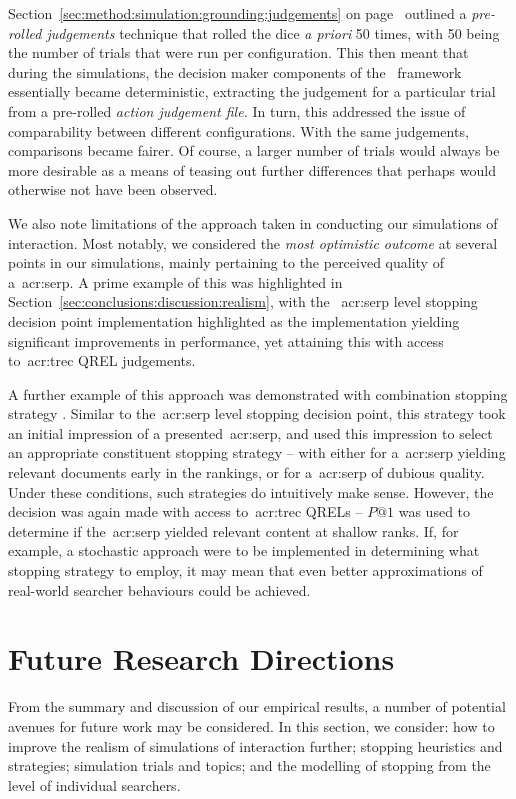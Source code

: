 Section~\ref{sec:method:simulation:grounding:judgements} on page~\pageref{sec:method:simulation:grounding:judgements} outlined a \emph{pre-rolled judgements} technique that rolled the dice \emph{a priori} 50 times, with 50 being the number of trials that were run per configuration. This then meant that during the simulations, the decision maker components of the \simiir~framework essentially became deterministic, extracting the judgement for a particular trial from a pre-rolled \emph{action judgement file.} In turn, this addressed the issue of comparability between different configurations. With the same judgements, comparisons became fairer. Of course, a larger number of trials would always be more desirable as a means of teasing out further differences that perhaps would otherwise not have been observed.

We also note limitations of the approach taken in conducting our simulations of interaction. Most notably, we considered the \emph{most optimistic outcome} at several points in our simulations, mainly pertaining to the perceived quality of a~\gls{acr:serp}. A prime example of this was highlighted in Section~\ref{sec:conclusions:discussion:realism}, with the ~\gls{acr:serp} level stopping decision point implementation highlighted as the implementation yielding significant improvements in performance, yet attaining this with access to~\gls{acr:trec} QREL judgements.

A further example of this approach was demonstrated with combination stopping strategy . Similar to the~\gls{acr:serp} level stopping decision point, this strategy took an initial impression of a presented~\gls{acr:serp}, and used this impression to select an appropriate constituent stopping strategy -- with either  for a~\gls{acr:serp} yielding relevant documents early in the rankings, or  for a~\gls{acr:serp} of dubious quality. Under these conditions, such strategies do intuitively make sense. However, the decision was again made with access to~\gls{acr:trec} QRELs -- $P@1$ was used to determine if the~\gls{acr:serp} yielded relevant content at shallow ranks. If, for example, a stochastic approach were to be implemented in determining what stopping strategy to employ, it may mean that even better approximations of real-world searcher behaviours could be achieved.

\section{Future Research Directions}\label{sec:conclusions:future}
From the summary and discussion of our empirical results, a number of potential avenues for future work may be considered. In this section, we consider: how to improve the realism of simulations of interaction further; stopping heuristics and strategies; simulation trials and topics; and the modelling of stopping from the level of individual searchers.

